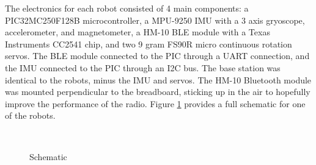 \documentclass[]{article}
\begin{document}
The electronics for each robot consisted of 4 main components: a PIC32MC250F128B microcontroller, a MPU-9250 IMU with a 3 axis gryoscope, accelerometer, and magnetometer, a HM-10 BLE module with a Texas Instruments CC2541 chip, and two 9 gram FS90R micro continuous rotation servos.
The BLE module connected to the PIC through a UART connection, and the IMU connected to the PIC through an I2C bus.
The base station was identical to the robots, minus the IMU and servos.
The HM-10 Bluetooth module was mounted perpendicular to the breadboard, sticking up in the air to hopefully improve the performance of the radio. Figure \ref{fig:schematic} provides a full schematic for one of the robots.

\begin{figure}
  \centering
  \\
  \caption{Schematic}
  \label{fig:schematic}
\end{figure}
\end{document}
